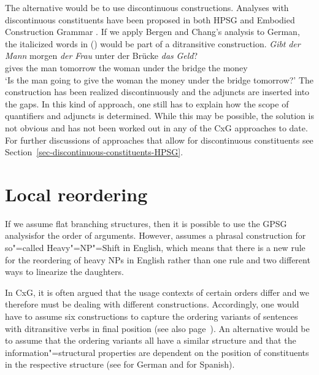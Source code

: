 The alternative would be to use discontinuous constructions. Analyses with discontinuous constituents have been proposed in both 
HPSG \citep{Reape94a} and Embodied Construction Grammar \citep{BC2005a}. If we apply Bergen and Chang's analysis to German,
the italicized words in () would be part of a ditransitive construction.
\ea
\gll \emph{Gibt} \emph{der} \emph{Mann} morgen \emph{der} \emph{Frau} unter der Brücke \emph{das} \emph{Geld}?\\
	 gives the man tomorrow the woman under the bridge the money\\
\glt `Is the man going to give the woman the money under the bridge tomorrow?'
\z
The construction has been realized discontinuously and the adjuncts are inserted into the gaps.
In this kind of approach, one still has to explain how the scope of quantifiers and adjuncts is determined.
While this may be possible, the solution is not obvious and has not been worked out in any of the
CxG approaches to date. For further discussions of approaches that allow for discontinuous constituents see Section~\ref{sec-discontinuous-constituents-HPSG}.

\section{Local reordering}

\largerpage
If we assume flat branching structures, then it is possible to use the GPSG analysis\indexgpsg for the order of arguments.
However, \citet{Kay2002a} assumes a phrasal construction for so"=called Heavy"=NP"=Shift in English, which means that there is a new rule for
the reordering of heavy NPs in English rather than one rule and two different ways to linearize the daughters.

In CxG, it is often argued that the usage contexts of certain orders differ and we therefore must be dealing with different constructions.
Accordingly, one would have to assume six constructions to capture the ordering variants of
sentences with ditransitive verbs in final position (see also page~\pageref{Regeln-PSG-Abfolge}). An alternative would be to assume that the ordering
variants all have a similar structure and that the information"=structural properties are dependent
on the position of constituents in the respective structure (see \citealp{deKuthy2000a} for German and \citealp{Bildhauer2008a}
for Spanish).

